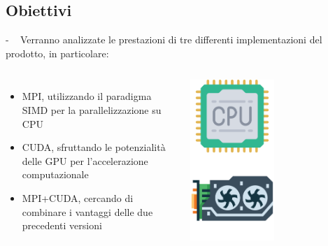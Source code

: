 \documentclass[compress]{beamer}
\begin{document}
\subsection{Obiettivi}
\begin{frame}{\secname \text{ }- \subsecname\ }
    Verranno analizzate le prestazioni di tre differenti implementazioni del prodotto, in particolare:
    \begin{columns}
            \begin{minipage}[b]{1\textwidth}
                \begin{itemize}
                    \item MPI, utilizzando il paradigma SIMD per la parallelizzazione su CPU
                    \item CUDA, sfruttando le potenzialità delle GPU per l'accelerazione computazionale
                    \item MPI+CUDA, cercando di combinare i vantaggi delle due precedenti versioni
                \end{itemize}
            \end{minipage}
            \begin{minipage}{1\textwidth}
                \begin{adjustbox}{margin=0cm 0cm 0cm 0.2cm, center} %
                    \includegraphics[width=0.5\textwidth]{resources/cpu_gpu.png}
                \end{adjustbox}
            \end{minipage}
    \end{columns}
\end{frame}
\end{document}
